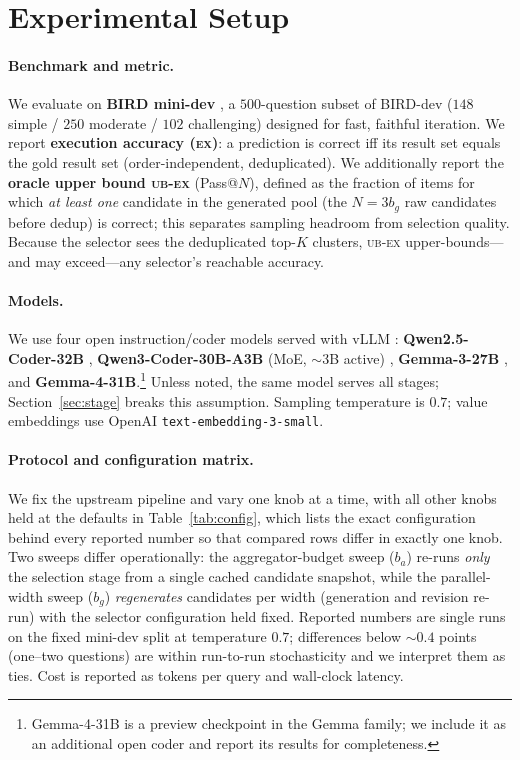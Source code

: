 \documentclass{article}
\newcommand{\ex}{\textsc{ex}\xspace}
\begin{document}
\section{Experimental Setup}
\label{sec:setup}

\paragraph{Benchmark and metric.}
We evaluate on \textbf{BIRD mini-dev} \citep{minidev2024}, a $500$-question subset of BIRD-dev ($148$ simple / $250$ moderate / $102$ challenging) designed for fast, faithful iteration. We report \textbf{execution accuracy (\ex)}: a prediction is correct iff its result set equals the gold result set (order-independent, deduplicated). We additionally report the \textbf{oracle upper bound \textsc{ub-ex}} (Pass@$N$), defined as the fraction of items for which \emph{at least one} candidate in the generated pool (the $N=3b_g$ raw candidates before dedup) is correct; this separates sampling headroom from selection quality. Because the selector sees the deduplicated top-$K$ clusters, \textsc{ub-ex} upper-bounds---and may exceed---any selector's reachable accuracy.

\paragraph{Models.}
We use four open instruction/coder models served with vLLM \citep{kwon2023vllm}: \textbf{Qwen2.5-Coder-32B} \citep{hui2024qwen25coder}, \textbf{Qwen3-Coder-30B-A3B} (MoE, $\sim$3B active) \citep{yang2025qwen3}, \textbf{Gemma-3-27B} \citep{kamath2025gemma3}, and \textbf{Gemma-4-31B}.\footnote{Gemma-4-31B is a preview checkpoint in the Gemma family; we include it as an additional open coder and report its results for completeness.} Unless noted, the same model serves all stages; Section~\ref{sec:stage} breaks this assumption. Sampling temperature is $0.7$; value embeddings use OpenAI \texttt{text-embedding-3-small}.

\paragraph{Protocol and configuration matrix.}
We fix the upstream pipeline and vary one knob at a time, with all other knobs held at the defaults in Table~\ref{tab:config}, which lists the exact configuration behind every reported number so that compared rows differ in exactly one knob. Two sweeps differ operationally: the aggregator-budget sweep ($b_a$) re-runs \emph{only} the selection stage from a single cached candidate snapshot, while the parallel-width sweep ($b_g$) \emph{regenerates} candidates per width (generation and revision re-run) with the selector configuration held fixed. Reported numbers are single runs on the fixed mini-dev split at temperature $0.7$; differences below $\sim\!0.4$ points (one--two questions) are within run-to-run stochasticity and we interpret them as ties. Cost is reported as tokens per query and wall-clock latency.
\end{document}
